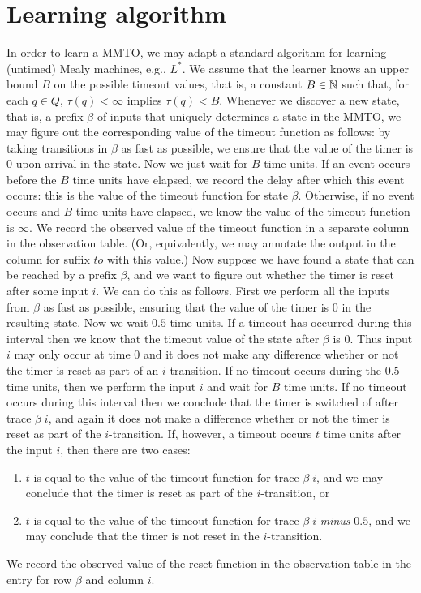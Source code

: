 \section{Learning algorithm}
In order to learn a MMTO, we may adapt a standard algorithm for learning (untimed) Mealy machines, e.g., $L^\ast$.
We assume that the learner knows an upper bound $B$ on the possible timeout values, that is, a constant $B \in {\mathbb N}$ such
that, for each $q \in Q$, $\tau(q) < \infty$ implies $\tau(q) < B$.
Whenever we discover a new state, that is, a prefix $\beta$ of inputs that uniquely determines a state in the MMTO,
we may figure out the corresponding value of the timeout function as follows: by taking transitions in $\beta$ as
fast as possible, we ensure that the value of the timer is $0$ upon arrival in the state.
Now we just wait for $B$ time units. If an event occurs before the $B$ time units have elapsed, we record the delay after
which this event occurs: this is the value of the timeout function for state $\beta$.
Otherwise, if no event occurs and $B$ time units have elapsed, we know the value of the timeout function is $\infty$.
We record the observed value of the timeout function in a separate column in the observation table.
(Or, equivalently, we may annotate the output in the column for suffix $\mathit{to}$ with this value.)
Now suppose we have found a state that can be reached by a prefix $\beta$, and we want to figure out
whether the timer is reset after some input $i$.
We can do this as follows.
First we perform all the inputs from $\beta$ as fast as possible, ensuring that the value of the timer is $0$ in
the resulting state.
Now we wait $0.5$ time units.
If a timeout has occurred during this interval then we know that the timeout value of the state after $\beta$ is $0$.
Thus input $i$ may only occur at time $0$ and it does not make any difference whether or not the timer is reset as part
of an $i$-transition.
If no timeout occurs during the $0.5$ time units, then we perform the input $i$ and wait for $B$ time units.
If no timeout occurs during this interval then we conclude that the timer is switched of after trace $\beta \; i$,
and again it does not make a difference whether or not the timer is reset as part of the $i$-transition.
If, however, a timeout occurs $t$ time units after the input $i$, then there are two cases:
\begin{enumerate}
\item
$t$ is equal to the value of the timeout function for trace $\beta \; i$, and we may conclude that
the timer is reset as part of the $i$-transition, or 
\item
$t$ is equal to the value of the timeout function for trace $\beta \; i$ \emph{minus} $0.5$, and
we may conclude that the timer is not reset in the $i$-transition.
\end{enumerate}
We record the observed value of the reset function in the observation table in the entry for row $\beta$ and
column $i$.


